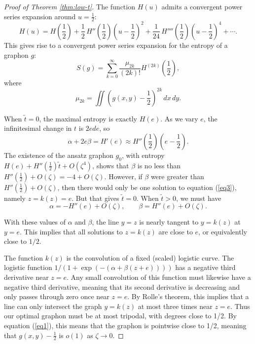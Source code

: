 \documentclass[12pt]{amsart}
\newcommand{\1}{\mathbf{1}}
\begin{document}
\begin{proof}[Proof of Theorem \ref{thm:low-t}]
\medskip

 The function $H(u)$
admits a convergent power series expansion around $u=\frac12$: 
\begin{equation}
H(u) = H\left (\frac12 \right ) + \frac12 \, H''\left ( \frac12 \right ) \left ( u-\frac12
\right )^2 + \frac{1}{24} \, H''''\left ( \frac12 \right ) \left (u-\frac12 \right )^4
+ \cdots.
\end{equation}
This gives rise to a convergent power series expansion for the entropy of a graphon $g$:
\begin{equation}
S(g) = \sum_{k=0}^\infty \frac{\mu_{2k}}{(2k)!} H^{(2k)}\left (\frac12\right ),
\end{equation}
where 
\begin{equation}
\mu_{2k} = \iint \left (g(x,y)-\frac12\right )^{2k} \,dx\,dy.
\end{equation}

When $\tilde t = 0$, the maximal entropy is exactly $H(e)$. As we vary $e$, the infinitesimal change in $t$ is $2e de$, so 
\begin{equation}
\alpha + 2e \beta = H'(e) \approx H''\left (\frac12 \right ) \left (e-\frac12\right ). 
\end{equation} 
The existence of the ansatz graphon $g_0$, with entropy $H(e) + H''(\frac12) \tilde t
+ O(\zeta^4)$, shows that $\beta$ is no less than 
$H''(\frac12) + O(\zeta) = -4+O(\zeta)$. However, if $\beta$ were greater than 
$H''(\frac12) + O(\zeta)$, then there would only be one solution to equation (\ref{eq3}),
namely $z=k(z)=e$. But that gives $\tilde t = 0$. When $\tilde t >0$, we must have 
\begin{equation}
\alpha = -H''(e) + O(\zeta), \qquad \beta = H''(e) + O(\zeta).
\end{equation}

\smallskip

 With these values of $\alpha$ and $\beta$, the line $y=z$ is 
nearly tangent to $y=k(z)$ at $y=e$. This implies that all solutions to $z=k(z)$ are 
close to $e$, or equivalently close to $1/2$. 

The function $k(z)$ is the convolution of a fixed (scaled) logistic curve. The 
logistic function $1/(1+\exp(-(\alpha+\beta(z+e))))$ has a negative third derivative near $z=e$. Any small convolution
of this function must likewise have a negative third derivative, meaning that its 
second derivative is decreasing and only passes through zero once near $z=e$. 
By Rolle's theorem, this implies 
that a line can only intersect the graph $y=k(z)$ at most three times near $z=e$.
Thus our optimal graphon must be at most tripodal, with degrees close to 1/2. By
equation (\ref{eq1}), this means that the graphon is pointwise close to 1/2, meaning
that $g(x,y) - \frac12$ is $o(1)$ as $\zeta \to 0$. 


\end{proof}
\end{document}
